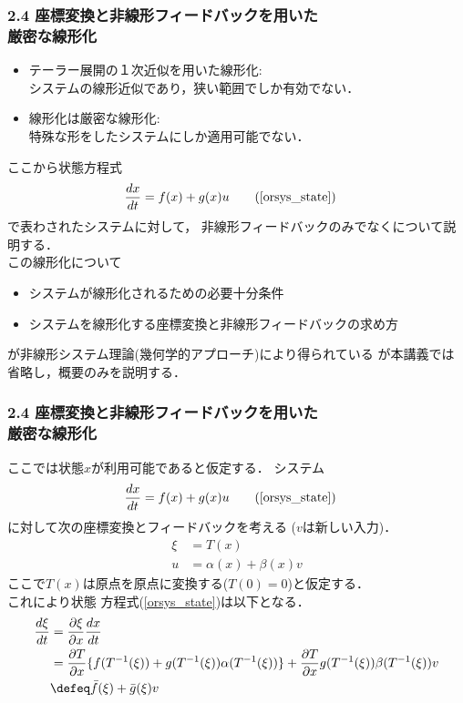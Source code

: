 \begin{frame}[t]
\frametitle{2.4 座標変換と非線形フィードバックを用いた
\\厳密な線形化}
\begin{itemize}
	\item テーラー展開の１次近似を用いた線形化:\\
	システムの線形近似であり，狭い範囲でしか有効でない．
	\item 線形化は厳密な線形化:\\
	特殊な形をしたシステムにしか適用可能でない．
\end{itemize}

ここから状態方程式
\begin{align}
 \frac{dx}{dt} &= f(x) + g(x) u \tag{\ref{orsys_state}}
\end{align}
で表わされたシステムに対して，
非線形フィードバックのみでなくについて説明する．\\
この線形化について
\begin{itemize}
	\item システムが線形化されるための必要十分条件
	\item システムを線形化する座標変換と非線形フィードバックの求め方
\end{itemize}
が非線形システム理論(幾何学的アプローチ)により得られている
が本講義では省略し，概要のみを説明する．
\end{frame}

\begin{frame}[t]
\frametitle{2.4 座標変換と非線形フィードバックを用いた\\
厳密な線形化}
ここでは状態$x$が利用可能であると仮定する．
システム
\begin{align}
 \frac{dx}{dt} &= f(x) + g(x) u \tag{\ref{orsys_state}}
 \end{align}
に対して次の座標変換とフィードバックを考える
($v$は新しい入力)．
\begin{align}
 \xi &= T(x) \label{cord} \\
 u   &= \alpha (x) + \beta (x) v
  \label{feedback}
\end{align}
ここで$T(x)$は原点を原点に変換する($T(0)=0$)と仮定する．\\
これにより状態
方程式(\ref{orsys_state})は以下となる．
\begin{align}
 \frac{d \xi}{dt} 
  &= \frac{\partial \xi}{\partial x} \frac{dx}{dt} \nonumber \\
 &= \frac{\partial T}{\partial x} 
  \{ f(T^{-1}(\xi)) + g(T^{-1}(\xi)) \alpha(T^{-1}(\xi)) \}
  + \frac{\partial T}{\partial x} g(T^{-1}(\xi)) \beta (T^{-1}(\xi)) v \\
 &\defeq \bar{f}(\xi) + \bar{g}(\xi) v
  \label{feed_state}
\end{align}

\end{frame}

